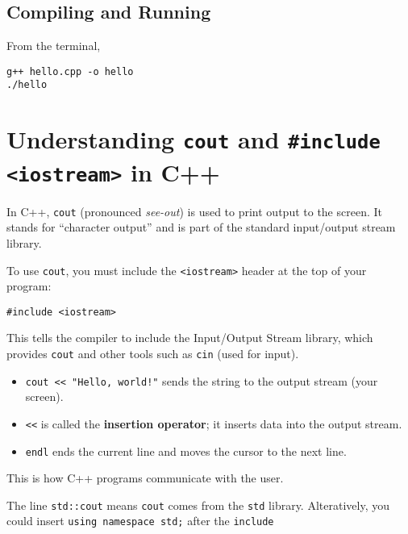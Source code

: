\documentclass{article}
\begin{document}
\subsection{Compiling and Running}
From the terminal,

\begin{verbatim}
g++ hello.cpp -o hello
./hello
\end{verbatim}


\section{Understanding \texttt{cout} and \texttt{\#include <iostream>} in C++}

In C++, \texttt{cout} (pronounced \textit{see-out}) is used to print output to the screen. It stands for ``character output'' and is part of the standard input/output stream library.

To use \texttt{cout}, you must include the \texttt{<iostream>} header at the top of your program:

\begin{verbatim}
#include <iostream>
\end{verbatim}

This tells the compiler to include the Input/Output Stream library, which provides \texttt{cout} and other tools such as \texttt{cin} (used for input).


\begin{itemize}
    \item \texttt{cout << "Hello, world!"} sends the string to the output stream (your screen).
    \item \texttt{<<} is called the \textbf{insertion operator}; it inserts data into the output stream.
    \item \texttt{endl} ends the current line and moves the cursor to the next line.
\end{itemize}

This is how C++ programs communicate with the user.

The line \texttt{std::cout} means \texttt{cout} comes from the \texttt{std} library. Alteratively, you could insert \texttt{using namespace std;} after the \texttt{include}
\end{document}
